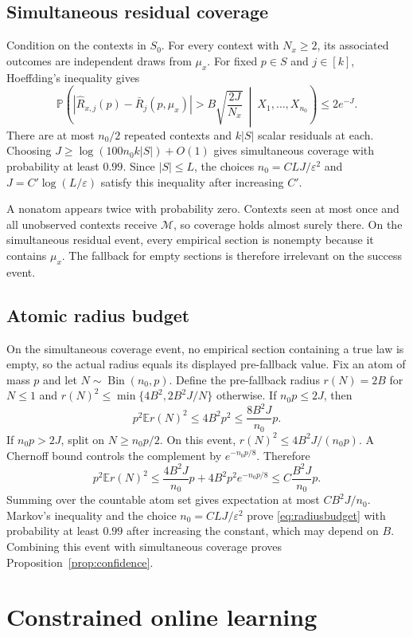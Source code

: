 \documentclass{article}
\theoremstyle{definition}
\theoremstyle{remark}
\newcommand{\E}{\mathbb E}
\newcommand{\Prb}{\mathbb P}
\newcommand{\1}{\mathbf 1}
\newcommand{\cM}{\mathcal M}
\begin{document}
\subsection{Simultaneous residual coverage}

Condition on the contexts in $S_0$. For every context with $N_x\ge2$, its associated outcomes are independent draws from $\mu_x$. For fixed $p\in S$ and $j\in[k]$, Hoeffding's inequality gives
\[
\Prb\!\left(\left|\widehat R_{x,j}(p)-\bar R_j(p,\mu_x)\right|>B\sqrt{\frac{2J}{N_x}}\ \middle|\ X_1,\ldots,X_{n_0}\right)\le2e^{-J}.
\]
There are at most $n_0/2$ repeated contexts and $k|S|$ scalar residuals at each. Choosing $J\ge\log(100n_0k|S|)+O(1)$ gives simultaneous coverage with probability at least $0.99$. Since $|S|\le L$, the choices $n_0=CLJ/\varepsilon^2$ and $J=C'\log(L/\varepsilon)$ satisfy this inequality after increasing $C'$.

A nonatom appears twice with probability zero. Contexts seen at most once and all unobserved contexts receive $\cM$, so coverage holds almost surely there. On the simultaneous residual event, every empirical section is nonempty because it contains $\mu_x$. The fallback for empty sections is therefore irrelevant on the success event.

\subsection{Atomic radius budget}

On the simultaneous coverage event, no empirical section containing a true law is empty, so the actual radius equals its displayed pre-fallback value. Fix an atom of mass $p$ and let $N\sim\operatorname{Bin}(n_0,p)$. Define the pre-fallback radius $r(N)=2B$ for $N\le1$ and $r(N)^2\le\min\{4B^2,2B^2J/N\}$ otherwise. If $n_0p\le2J$, then
\[
p^2\E r(N)^2\le4B^2p^2\le\frac{8B^2J}{n_0}p.
\]
If $n_0p>2J$, split on $N\ge n_0p/2$. On this event, $r(N)^2\le4B^2J/(n_0p)$. A Chernoff bound controls the complement by $e^{-n_0p/8}$. Therefore
\[
p^2\E r(N)^2
\le \frac{4B^2J}{n_0}p+4B^2p^2e^{-n_0p/8}
\le C\frac{B^2J}{n_0}p.
\]
Summing over the countable atom set gives expectation at most $CB^2J/n_0$. Markov's inequality and the choice $n_0=CLJ/\varepsilon^2$ prove \eqref{eq:radiusbudget} with probability at least $0.99$ after increasing the constant, which may depend on $B$. Combining this event with simultaneous coverage proves Proposition~\ref{prop:confidence}.

\section{Constrained online learning}\label{app:online}
\end{document}
